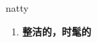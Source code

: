 
\begin{frame}
{\huge natty}
\begin{center}
\begin{enumerate}\Large
  \item \textbf{整洁的，时髦的}
\end{enumerate}
\end{center}
\end{frame}
